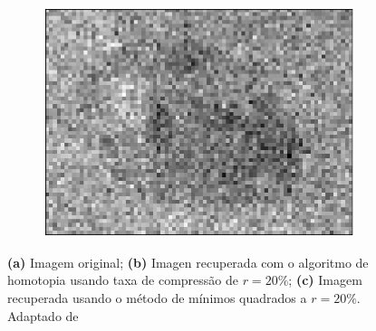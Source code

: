 {\begin{figure}
\begin{subfigure}[b]{0.3\textwidth}
        \caption{}
	    \label{fig:homotopy_20porc}
    \end{subfigure}
    ~
    \begin{subfigure}[b]{0.3\textwidth}
        \centering
        \includegraphics[scale=.35]{imagens/homotopy/joaninhaMMQ_20porcento.png}
        \caption{}
	    \label{fig:homotopy_40porc}
    \end{subfigure}
    \caption{{\bf (a)} Imagem original; {\bf (b)} Imagen recuperada com o algoritmo de homotopia usando taxa de compressão de $r = 20\%$; {\bf (c)} Imagem recuperada usando o método de mínimos quadrados a  $r = 20\%$. Adaptado de \protect \footnotemark }
    \label{fig:homotopy}
\end{figure}
}
\clearpage